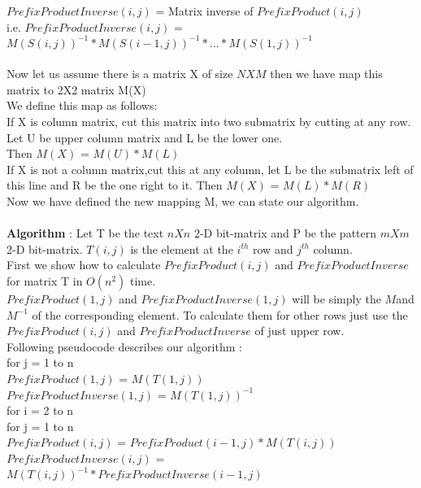 \documentclass{article}
\begin{document}
$PrefixProductInverse(i,j)$ = Matrix inverse of $PrefixProduct(i,j)$ \\
i.e. $PrefixProductInverse(i,j)$ = $M(S(i,j))^{-1} * M(S(i-1,j))^{-1} * ... * M(S(1,j))^{-1}$ \\\\
Now let us assume there is a matrix X of size $NXM$ then we have map this matrix to 2X2 matrix M(X) \\
We define this map as follows: \\ 
If X is column matrix, cut this matrix into two submatrix by cutting at any row. Let U be upper column matrix and L be the lower one. \\
Then $M(X)$ = $M(U) * M(L)$ \\ 
If X is not a column matrix,cut this at any column, let L be the submatrix left of this line and R be the one right to it.
Then $M(X)$ = $M(L) * M(R)$ \\
Now we have defined the new mapping M, we can state our algorithm. \\\\
\textbf{Algorithm} : 
Let T be the text $nXn$ 2-D bit-matrix and P be the pattern $mXm$ 2-D bit-matrix.
$T(i,j)$ is the element at the $i^{th}$ row and $j^{th}$ column.\\  
First we show how to calculate $PrefixProduct(i,j)$ and $PrefixProductInverse$ for matrix T in $O(n^{2})$ time. \\
$PrefixProduct(1,j)$ and $PrefixProductInverse(1,j)$ will be simply the $M $and $M^{-1}$ of the corresponding element.
To calculate them for other rows just use the $PrefixProduct(i,j)$ and $PrefixProductInverse$ of just upper row. \\
Following pseudocode describes our algorithm : \\
for j = 1 to n  \\
\hspace*{1cm}	$PrefixProduct(1,j)$ = $M(T(1,j))$ \\ 
\hspace*{1cm}	$PrefixProductInverse(1,j)$ = $M(T(1,j))^{-1}$ \\
for i = 2 to n  \\ 
\hspace*{1cm} for j = 1 to n \\ 
\hspace*{2cm} $PrefixProduct(i,j)$ = $PrefixProduct(i-1,j)*M(T(i,j))$ \\
\hspace*{2cm} $PrefixProductInverse(i,j)$ = $M(T(i,j))^{-1}*PrefixProductInverse(i-1,j)$ \\ \\
\end{document}
